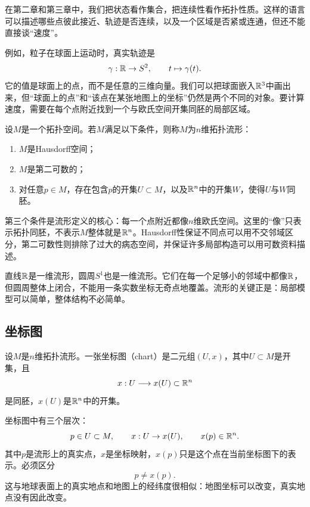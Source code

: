 在第二章和第三章中，我们把状态看作集合，把连续性看作拓扑性质。这样的语言可以描述哪些点彼此接近、轨迹是否连续，以及一个区域是否紧或连通，但还不能直接谈“速度”。

例如，粒子在球面上运动时，真实轨迹是
\[
    \gamma:\mathbb{R}\to S^2,\qquad t\mapsto\gamma(t).
\]
它的值是球面上的点，而不是任意的三维向量。我们可以把球面嵌入$\mathbb{R}^3$中画出来，但“球面上的点”和“该点在某张地图上的坐标”仍然是两个不同的对象。要计算速度，需要在每个点附近找到一个与欧氏空间开集同胚的局部区域。

\begin{definition}[拓扑流形]
设$M$是一个拓扑空间。若$M$满足以下条件，则称$M$为$n$维拓扑流形：
\begin{enumerate}
    \item $M$是Hausdorff空间；
    \item $M$是第二可数的；
    \item 对任意$p\in M$，存在包含$p$的开集$U\subset M$，以及$\mathbb{R}^n$中的开集$W$，使得$U$与$W$同胚。
\end{enumerate}
\end{definition}

第三个条件是流形定义的核心：每一个点附近都像$n$维欧氏空间。这里的“像”只表示拓扑同胚，不表示$M$整体就是$\mathbb{R}^n$。Hausdorff性保证不同点可以用不交邻域区分，第二可数性则排除了过大的病态空间，并保证许多局部构造可以用可数资料描述。

\begin{remark}[局部与整体]
直线$\mathbb{R}$是一维流形，圆周$S^1$也是一维流形。它们在每一个足够小的邻域中都像$\mathbb{R}$，但圆周整体上闭合，不能用一条实数坐标无奇点地覆盖。流形的关键正是：局部模型可以简单，整体结构不必简单。
\end{remark}

\subsection{坐标图}

\begin{definition}[坐标图]
设$M$是$n$维拓扑流形。一张坐标图（chart）是二元组$(U,x)$，其中$U\subset M$是开集，且
\[
    x:U\longrightarrow x(U)\subset\mathbb{R}^n
\]
是同胚，$x(U)$是$\mathbb{R}^n$中的开集。
\end{definition}

坐标图中有三个层次：
\[
    p\in U\subset M,\qquad
    x:U\to x(U),\qquad
    x(p)\in\mathbb{R}^n.
\]
其中$p$是流形上的真实点，$x$是坐标映射，$x(p)$只是这个点在当前坐标图下的表示。必须区分
\[
    p\neq x(p).
\]
这与地球表面上的真实地点和地图上的经纬度很相似：地图坐标可以改变，真实地点没有因此改变。

